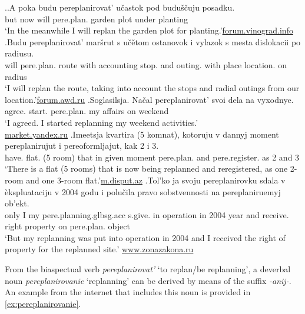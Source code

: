 \ex.\label{ex:pereplanirovat:imperf}\ag.\label{ex:pereplanirovat:future1}A poka budu pereplanirovat'\textsuperscript{\IPF} u\v{c}astok pod budu\v{s}\v{c}uju posadku.\\
but now will pere.plan. {garden plot} under  planting\\
\trans `In the meanwhile I will replan the garden plot for  planting.'\hbox{}\hfill\hbox{\url{forum.vinograd.info}}
\bg.\label{ex:pereplanirovat:future2}Budu pereplanirovat' mar\v{s}rut s u\v{c}\v{e}tom ostanovok i vylazok s mesta dislokacii po radiusu.\\
will pere.plan. route with accounting stop. and outing. with place location. on radius\\
\trans `I will replan the route, taking into account the stops and radial outings from our location.'\hbox{}\hfill\hbox{\url{forum.awd.ru}}
\bg.\label{ex:pereplanirovat:start}Soglasilsja. Na\v{c}al pereplanirovat' svoi dela na vyxodnye.\\
agree. start. pere.plan. my affairs on weekend\\
\trans `I agreed. I started replanning my weekend activities.'\\\hbox{}\hfill\hbox{\url{market.yandex.ru}}
\bg.\label{ex:pereplanirovat:prog}Imeetsja kvartira (5 komnat), kotoruju v dannyj moment pereplanirujut i pereoformljajut, kak 2 i 3.\\
have. flat. (5 room) that in given moment pere.plan. and pere.register. as 2 and 3\\
\trans `There is a flat (5 rooms) that is now being replanned and reregistered, as one 2-room and one 3-room flat.'\hbox{}\hfill\hbox{\url{m.disput.az}}
\bg.\label{ex:pereplanirovat:part}Tol'ko ja svoju pereplanirovku sdala v \`{e}kspluataciju v 2004 godu i polu\v{c}ila pravo sobstvennosti na pereplaniruemyj ob'ekt.\\
only I my pere.planning.glb{sg.acc} s.give. in operation in 2004 year and receive. right property on pere.plan. object\\
`But my replanning was put into operation in 2004 and I received the right of property for the replanned site.'
\hbox{}\hfill\hbox{\url{www.zonazakona.ru}}

From the biaspectual verb \textit{pereplanirovat'} `to replan/be replanning', a deverbal noun \textit{pereplanirovanie} `replanning' can be derived by means of the suffix \textit{-anij-}. An example from the internet that includes this noun is provided in \ref{ex:pereplanirovanie}.\pagebreak

